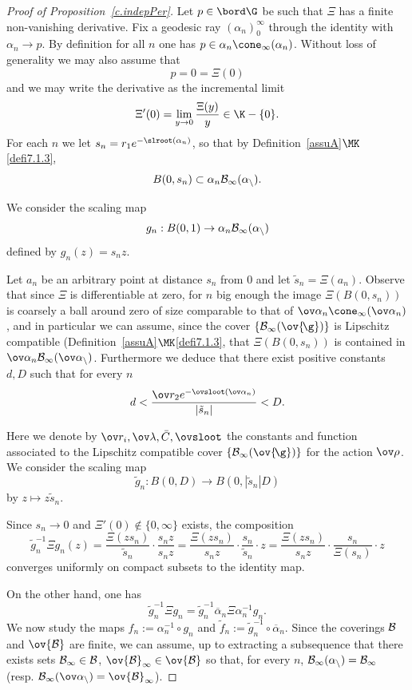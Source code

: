 \begin{proof}[Proof of Proposition~\ref{c.indepPer}]
Let $p\in\bord\G$ be such that $\Xi$ has a finite non-vanishing derivative. Fix a geodesic ray $(\alpha_n)_{0}^\infty$ through the identity with $\alpha_{n}\to p$. By definition for all $n$ one has $p\in\alpha_n\cone_\infty(\alpha_n)$. Without loss of generality we may also assume that
\[
p=0=\Xi(0)
\]
and we may write the derivative as the incremental limit
\[
\Xi'(0)=\lim_{y\to 0}\frac{\Xi(y)}{y}\in\K-\{0\}.
\]
For each $n$ we let $s_n=r_1e^{-\slroot(\alpha_n)}$, so that by Definition~\ref{assuA}$\MK$\eqref{defi7.1.3},
\[
B(0,s_n)\subset\alpha_n\cal B_\infty (\alpha_n).
\]

\pagebreak{}
We consider the scaling map
\[
g_n:B(0,1)\to \alpha_n\cal B_\infty(\alpha_n)
\]
defined by $g_n(z)=s_n z$.

Let $a_n$ be an arbitrary point at distance $s_n$ from $0$ and let $\tilde s_n=\Xi(a_n)$. Observe that since $\Xi$ is differentiable at zero, for $n$ big enough the image $\Xi(B(0,s_n))$ is coarsely a ball around zero of size comparable to that of $\ov\alpha_n\cone_\infty(\ov\alpha_n)$, and in particular we can assume, since the cover $\{\cal B_\infty(\ov{\!\g})\}$ is Lipschitz compatible (Definition~\ref{assuA}$\MK$\eqref{defi7.1.3}, that $\Xi(B(0,s_n))$ is contained in $\ov\alpha_n\cal B_\infty(\ov\alpha_n)$. Furthermore we deduce that there exist positive constants $d,D$ such that for every $n$
\[
d<\frac{\ov r_2e^{-\ovsloot(\ov\alpha_n)}}{|\tilde s_n|}<D.
\]

Here we denote by $\ov r_i, \ov \lambda, \bar{C}, \ovsloot$ the constants and function associated to the Lipschitz compatible cover $\{\cal B_\infty(\ov{\!\g})\}$ for the action $\ov \rho$. We consider the scaling map
\[
\tilde g_n:B(0,D)\to B(0,|\tilde s_n|D)
\]
by $z\mapsto z\tilde s_n$.

Since $s_n\to0$ and $\Xi'(0)\notin\{0,\infty\}$ exists, the composition
\[
\tilde g_n^{-1}\Xi g_n(z)=\frac{\Xi(zs_n)}{\tilde s_n}\cdot\frac{s_nz}{s_nz}=\frac{\Xi(zs_n)}{s_nz}\cdot\frac{s_n}{\tilde s_n}\cdot z=\frac{\Xi(zs_n)}{s_nz}\cdot\frac{s_n}{\Xi(s_n)}\cdot z
\]
converges uniformly on compact subsets to the identity map.



On the other hand, one has
\[
\tilde g_n^{-1}\Xi g_n=\tilde g_n^{-1}\overline\alpha_{n}\Xi\alpha_{n}^{-1} g_n.
\]
We now study the maps $f_n:=\alpha_{n}^{-1}\circ g_n$ and $\tilde f_n:=\tilde g_n^{-1}\circ\overline\alpha_{n}$. Since the coverings $\cal B$ and $\ov {\cal B}$ are finite, we can assume, up to extracting a subsequence that there exists sets $\cal B_\infty\in \cal B$, $\ov{\cal B}_\infty\in \ov {\cal B}$ so that, for every $n$, $\cal B_\infty(\alpha_n)=\cal B_\infty$ (resp. $\cal B_\infty(\ov\alpha_n)=\ov{\cal B}_\infty$).



\end{proof}
